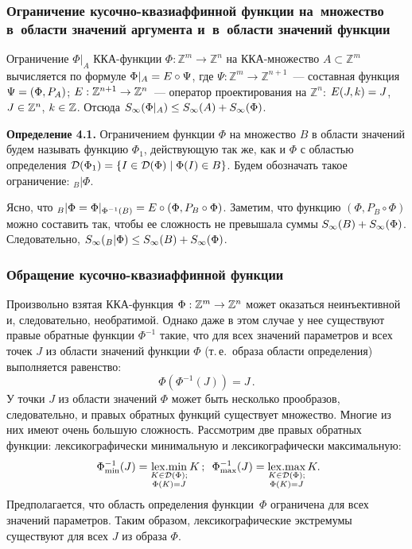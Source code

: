 \begin{multicols}{2}
\subsubsection{Ограничение кусочно-квазиаффинной функции на~множество в~области значений
аргумента и~в~области значений функции} %

Ограничение $\Phi|_A$ ККА-функции $\Phi:\mathbb{Z}^m\to\mathbb{Z}^n$
на ККА-множество $A\subset \mathbb{Z}^m$ вычисляется по формуле
$\Phi|_A \hm= E\circ \Psi$, где
$\Psi:\mathbb{Z}^m\to\mathbb{Z}^{n+1}$~--- составная функция
$\Psi\hm=(\Phi,P_A)$; $E:\mathbb{Z}^{n+1}\hm\to\mathbb{Z}^{n}$~--- оператор
проектирования на $\mathbb{Z}^n$: $E(J,k)\hm=J$, $J\hm\in\mathbb{Z}^n$,
$k\hm\in\mathbb{Z}$. Отсюда $S_\infty(\Phi|_A) \hm\leq
S_\infty(A)\hm+S_\infty(\Phi)$.

\smallskip

\noindent
\textbf{Определение 4.1.}
Ограничением функции $\Phi$ на множество $B$ в области значений
будем называть функцию $\Phi_1$, действующую так же, как и $\Phi$ с
областью определения ${\cal D}(\Phi_1)\hm=\{ I\in {\cal D}(\Phi) \mid
\Phi(I)\hm\in B \}$.  Будем обозначать такое ограничение: $_B|\Phi$.

\smallskip

Ясно, что $_B|\Phi = \Phi|_{\Phi^{-1}(B)} \hm= E\circ (\Phi, P_B\circ
\Phi)$. Заметим, что функцию $(\Phi, P_B\circ \Phi)$ можно составить
так, чтобы ее сложность не превышала суммы
$S_\infty(B)\hm+S_\infty(\Phi)$. Следовательно, $S_\infty(_B|\Phi) \hm\leq
S_\infty(B)\hm+S_\infty(\Phi)$.


\subsubsection{Обращение кусочно-квазиаффинной функции} %

Произвольно взятая ККА-функция $\Phi:\mathbb{Z}^m\hm\to\mathbb{Z}^n$
может оказаться неинъективной и, следовательно, необратимой. Однако
даже в этом случае у нее существуют правые обратные функции
$\Phi^{-1}$ такие, что для всех значений параметров и всех точек $J$
из области значений функции $\Phi$ (т.\,е.\ образа области
определения) выполняется равенство:
$$
\Phi(\Phi^{-1}(J))=J\,.
$$
У точки $J$ из области значений $\Phi$ может быть несколько
прообразов, следовательно, и правых обратных функций существует
множество. Многие из них имеют очень большую сложность. Рассмотрим
две правых обратных функции: лексикографически минимальную и
лексикографически максимальную:
\begin{equation}
  \Phi^{-1}_{\min}(J) = 
\mathop{\mathrm{lex.min}}\limits_{ \substack{{K\in{\cal D}(\Phi);}\\ {\Phi(K)=J} }} K\,; 
\enskip \Phi^{-1}_{\max}(J) =\mathop{\mathrm{lex.max}}\limits_{\substack{{K\in{\cal D}(\Phi)};\\ 
{\Phi(K)=J}} }K. \!\!
\label{invLexMinMax}
\end{equation}
Предполагается, что область определения функции~$\Phi$ ограничена
для всех значений параметров. Таким образом, лексикографические
экстремумы существуют для всех $J$ из образа $\Phi$.


\end{multicols}
